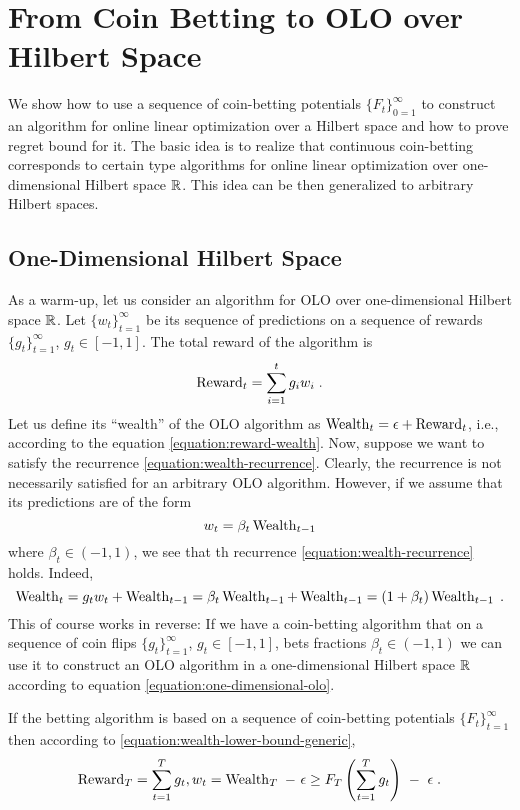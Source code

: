 \section{From Coin Betting to OLO over Hilbert Space}

We show how to use a sequence of coin-betting potentials $\{F_t\}_{0=1}^\infty$
to construct an algorithm for online linear optimization over a Hilbert space
and how to prove regret bound for it. The basic idea is to realize that
continuous coin-betting corresponds to certain type algorithms
for online linear optimization over one-dimensional Hilbert space $\mathbb{R}$.
This idea can be then generalized to arbitrary Hilbert spaces.

\subsection{One-Dimensional Hilbert Space}

As a warm-up, let us consider an algorithm for OLO over one-dimensional Hilbert
space $\mathbb{R}$. Let $\{w_t\}_{t=1}^\infty$ be its sequence of predictions on a
sequence of rewards $\{g_t\}_{t=1}^\infty$, $g_t \in [-1,1]$. The total reward
of the algorithm is
$$
\operatorname{Reward}_t = \sum_{i=1}^t g_i w_i \; .
$$
Let us define its ``wealth'' of the OLO algorithm as $\operatorname{Wealth}_t = \epsilon +
\operatorname{Reward}_t$, i.e., according to the equation \eqref{equation:reward-wealth}. Now,
suppose we want to satisfy the recurrence \eqref{equation:wealth-recurrence}.
Clearly, the recurrence is not necessarily satisfied for an arbitrary
OLO algorithm. However, if we assume that its predictions are of the form
\begin{equation}
\label{equation:one-dimensional-olo}
w_t = \beta_t \operatorname{Wealth}_{t-1}
\end{equation}
where $\beta_t \in (-1,1)$, we see that th recurrence
\eqref{equation:wealth-recurrence} holds. Indeed,
$$
\operatorname{Wealth}_t
= g_t w_t + \operatorname{Wealth}_{t-1}
= \beta_t \operatorname{Wealth}_{t-1} + \operatorname{Wealth}_{t-1}
= (1+\beta_t) \operatorname{Wealth}_{t-1} \; .
$$
This of course works in reverse: If we have a coin-betting algorithm that on a
sequence of coin flips $\{g_t\}_{t=1}^\infty$, $g_t \in [-1,1]$, bets fractions
$\beta_t \in (-1,1)$ we can use it to construct an OLO algorithm in a
one-dimensional Hilbert space $\mathbb{R}$ according to equation
\eqref{equation:one-dimensional-olo}.

If the betting algorithm is based on a sequence of coin-betting potentials
$\{F_t\}_{t=1}^\infty$ then according to \eqref{equation:wealth-lower-bound-generic},
\begin{equation}
\label{equation:one-dimensional-olo-reward-lower-bound}
\Reward_T
= \sum_{t=1}^T g_t, w_t
= \Wealth_T \ - \ \epsilon \ge F_T\left(\sum_{t=1}^T g_t \right) \ - \ \epsilon \; .
\end{equation}

